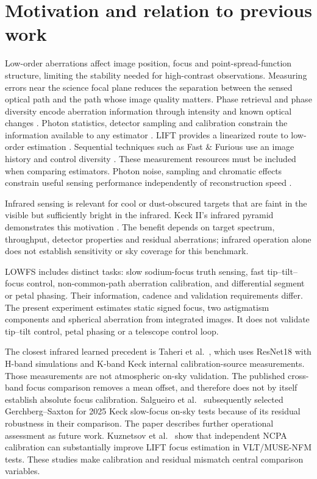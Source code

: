 \documentclass[11pt,a4paper]{article}
\begin{document}
\section{Motivation and relation to previous work}
Low-order aberrations affect image position, focus and point-spread-function
structure, limiting the stability needed for high-contrast observations.
Measuring errors near the science focal plane reduces the separation between
the sensed optical path and the path whose image quality matters. Phase
retrieval and phase diversity encode aberration information through intensity
and known optical changes \cite{fienup,paxman}. Photon statistics, detector
sampling and calibration constrain the information available to any estimator
\cite{guyon}. LIFT provides a linearized route to low-order estimation
\cite{meimon,plantet2011,plantet2013}. Sequential techniques such as Fast \&
Furious use an image history and control diversity \cite{korkiakoski,bos}.
These measurement resources must be included when comparing estimators.
Photon noise, sampling and chromatic effects constrain useful sensing
performance independently of reconstruction speed \cite{guyon}.

Infrared sensing is relevant for cool or dust-obscured targets that are faint
in the visible but sufficiently bright in the infrared. Keck II's infrared
pyramid demonstrates this motivation \cite{bond}. The benefit depends on target
spectrum, throughput, detector properties and residual aberrations; infrared
operation alone does not establish sensitivity or sky coverage for this benchmark.

LOWFS includes distinct tasks: slow sodium-focus truth sensing, fast
tip--tilt--focus control, non-common-path aberration calibration, and differential
segment or petal phasing. Their information, cadence and validation requirements
differ. The present experiment estimates static signed focus, two astigmatism
components and spherical aberration from integrated images. It does not validate
tip--tilt control, petal phasing or a telescope control loop.

The closest infrared learned precedent is Taheri et al.\ \cite{taheri}, which
uses ResNet18 with H-band simulations and K-band Keck internal calibration-source
measurements. Those measurements are not atmospheric on-sky validation.
The published cross-band focus comparison removes a mean offset, and therefore
does not by itself establish absolute focus calibration.
Salgueiro et al.\ \cite{salgueiro} subsequently selected Gerchberg--Saxton for
2025 Keck slow-focus on-sky tests because of its residual robustness in their
comparison. The paper describes further operational assessment as future work.
Kuznetsov et al.\ \cite{kuznetsov} show that independent NCPA calibration can
substantially improve LIFT focus estimation in VLT/MUSE-NFM tests. These studies
make calibration and residual mismatch central comparison variables.
\end{document}
